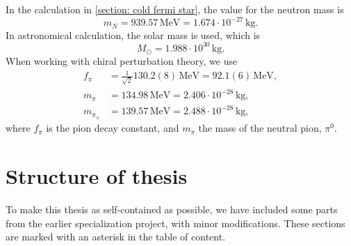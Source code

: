 %
In the calculation in \autoref{section: cold fermi star}, the value for the neutron mass is
%
\begin{equation}
    \label{mass of neutron}
    m_N = 939.57 \, \text{MeV} = 1.674\cdot 10^{-27} \, \text{kg}.
\end{equation}
%
In astronomical calculation, the solar mass is used, which is
%
\begin{equation}
    \label{solar mass}
    M_\odot = 1.988 \cdot 10^{30} \, \text{kg}.
\end{equation}
%
When working with chiral perturbation theory, we use
%
\begin{align}
    \label{pion decay constant}
    f_\pi & = \frac{1}{\sqrt{2}}130.2 (8) \, \text{MeV} = 92.1(6) \, \text{MeV}, \\
    \label{pion mass}
    m_\pi & = 134.98 \, \text{MeV} = 2.406 \cdot 10^{-28} \, \text{kg}, \\
    \label{charged pion mass}
    m_{\pi_\pm} &= 139.57 \, \text{MeV} = 2.488 \cdot 10^{-28}\, \text{kg},
\end{align}
%
where $f_\pi$ is the pion decay constant, and $m_\pi$ the mass of the neutral pion, $\pi^0$.

\section{Structure of thesis}

To make this thesis as self-contained as possible, we have included some parts from the earlier specialization project, with minor modifications.
These sections are marked with an asterisk in the table of content.
